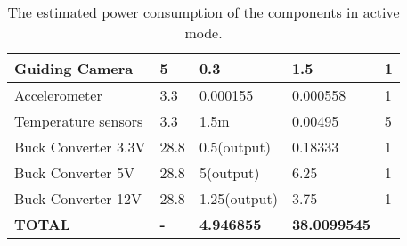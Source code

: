 \begin{center}
\begin{table}[H]
\begin{tabular}{|m{}|m{}|m{}|m{}|m{}|}
Guiding Camera          & 5                               & 0.3                                 & 1.5                          & 1                 \\ \hline
Accelerometer           & 3.3                             & 0.000155                            & 0.000558                     & 1                 \\ \hline
Temperature sensors     & 3.3                             & 1.5m                                & 0.00495                      & 5                 \\ \hline
Buck Converter 3.3V     & 28.8                            & 0.5(output)                         & 0.18333                      & 1                 \\ \hline
Buck Converter 5V       & 28.8                            & 5(output)                           & 6.25                       & 1                 \\ \hline
Buck Converter 12V      & 28.8                            & 1.25(output)                        & 3.75                         & 1                 \\ \hline
\textbf{TOTAL}          & \textbf{-}                      & \textbf{4.946855}                   & \textbf{38.0099545}           &                   \\ \hline
\end{tabular}
\caption{The estimated power consumption of the components in active mode.}
\end{table}
\label{tab: power consumption}
\end{center}




\raggedbottom